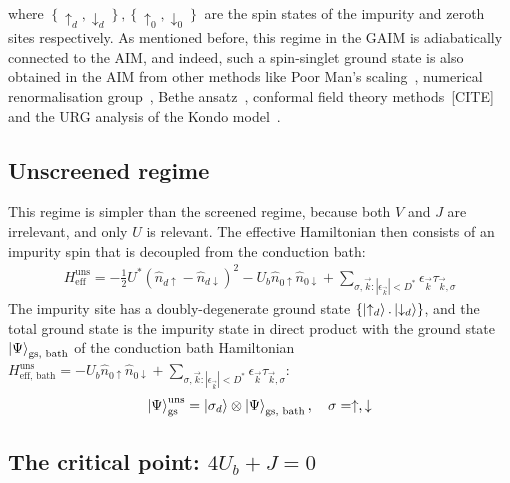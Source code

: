 \documentclass[reprint,superscriptaddress,floatfix]{revtex4-2}
\begin{document}
where \(\left\{\uparrow_d, \downarrow_d\right\}, \left\{\uparrow_0, \downarrow_0\right\}\) are the spin states of the impurity and zeroth sites respectively. As mentioned before, this regime in the GAIM is adiabatically connected to the AIM, and indeed, such a spin-singlet ground state is also obtained in the AIM from other methods like Poor Man's scaling~\cite{anderson1969exact,anderson1970}, numerical renormalisation group~\cite{wilson1975,hrk_wilson_1980}, Bethe ansatz~\cite{}, conformal field theory methods~\cite{}[CITE] and the URG analysis of the Kondo model~\cite{anirban_kondo}.

\subsection{Unscreened regime}

This regime is simpler than the screened regime, because both \(V\) and \(J\) are irrelevant, and only \(U\) is relevant. The effective Hamiltonian then consists of an impurity spin that is decoupled from the conduction bath:
\begin{equation}\begin{aligned}
	H_\text{eff}^\text{uns} = -\frac{1}{2}U^*\left(\hat n_{d \uparrow} - \hat n_{d \downarrow}\right)^2 - U_b \hat n_{0 \uparrow} \hat n_{0 \downarrow} + \sum_{\sigma,\vec k:|\epsilon_{\vec k}| < D^*} \epsilon_{\vec k} \tau_{\vec k,\sigma}
\end{aligned}\end{equation}
The impurity site has a doubly-degenerate ground state \(\left\{ \ket{\uparrow_d}.\ket{\downarrow_d}\right\}\), and the total ground state is the impurity state in direct product with the ground state \(\ket{\Psi}_\text{gs, bath}\) of the conduction bath Hamiltonian \(H_\text{eff, bath}^\text{uns} =  - U_b \hat n_{0 \uparrow} \hat n_{0 \downarrow} + \sum_{\sigma,\vec k:|\epsilon_{\vec k}| < D^*} \epsilon_{\vec k} \tau_{\vec k,\sigma}\):
\begin{equation}\begin{aligned}
	\ket{\Psi}_\text{gs}^\text{uns} = \ket{\sigma_d}\otimes\ket{\Psi}_\text{gs, bath}, ~ ~ ~ \sigma = \uparrow,\downarrow
\end{aligned}\end{equation}



\subsection{The critical point: \(4U_b + J = 0\)}
\end{document}
